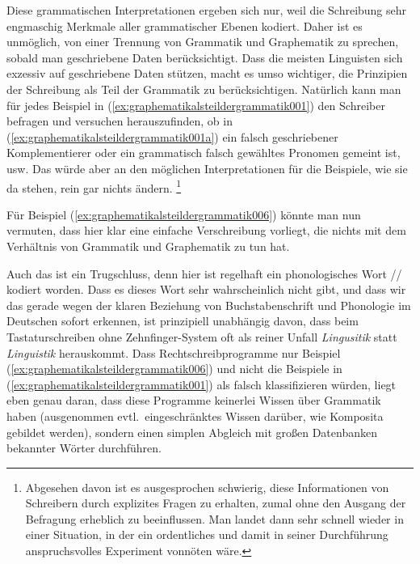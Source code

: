 Diese grammatischen Interpretationen ergeben sich nur, weil die Schreibung sehr engmaschig Merkmale aller grammatischer Ebenen kodiert.
Daher ist es unmöglich, von einer Trennung von Grammatik und Graphematik zu sprechen, sobald man geschriebene Daten berücksichtigt.
Dass die meisten Linguisten sich exzessiv auf geschriebene Daten stützen, macht es umso wichtiger, die Prinzipien der Schreibung als Teil der Grammatik zu berücksichtigen.
Natürlich kann man für jedes Beispiel in (\ref{ex:graphematikalsteildergrammatik001}) den Schreiber befragen und versuchen herauszufinden, ob in (\ref{ex:graphematikalsteildergrammatik001a}) ein falsch geschriebener Komplementierer oder ein grammatisch falsch gewähltes Pronomen gemeint ist, usw.
Das würde aber an den möglichen Interpretationen für die Beispiele, wie sie da stehen, rein gar nichts ändern.%
\footnote{Abgesehen davon ist es ausgesprochen schwierig, diese Informationen von Schreibern durch explizites Fragen zu erhalten, zumal ohne den Ausgang der Befragung erheblich zu beeinflussen.
Man landet dann sehr schnell wieder in einer Situation, in der ein ordentliches und damit in seiner Durchführung anspruchsvolles Experiment vonnöten wäre.}

Für Beispiel (\ref{ex:graphematikalsteildergrammatik006}) könnte man nun vermuten, dass hier klar eine einfache Verschreibung vorliegt, die nichts mit dem Verhältnis von Grammatik und Graphematik zu tun hat.

\begin{exe}
\end{exe}

Auch das ist ein Trugschluss, denn hier ist regelhaft ein phonologisches Wort // kodiert worden.
Dass es dieses Wort sehr wahrscheinlich nicht gibt, und dass wir das gerade wegen der klaren Beziehung von Buchstabenschrift und Phonologie im Deutschen sofort erkennen, ist prinzipiell unabhängig davon, dass beim Tastaturschreiben ohne Zehnfinger-System oft als reiner Unfall \textit{Lingusitik} statt \textit{Linguistik} herauskommt.
Dass Rechtschreibprogramme nur Beispiel (\ref{ex:graphematikalsteildergrammatik006}) und nicht die Beispiele in (\ref{ex:graphematikalsteildergrammatik001}) als falsch klassifizieren würden, liegt eben genau daran, dass diese Programme keinerlei Wissen über Grammatik haben (ausgenommen evtl.\ eingeschränktes Wissen darüber, wie Komposita gebildet werden), sondern einen simplen Abgleich mit großen Datenbanken bekannter Wörter durchführen.

